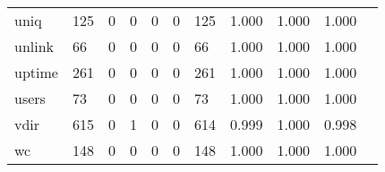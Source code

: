 \begin{longtable}{lp{1.2cm}p{1.2cm}p{1.2cm}p{1.2cm}p{1.2cm}p{1.2cm}p{1.2cm}p{1.2cm}p{1.2cm}p{1.2cm}}
uniq      &                                   125 &                                                  0 &                                                  0 &                                                  0 &                                                  0 &                                                125 &                                         1.000 &                                              1.000 &                                              1.000 \\
unlink    &                                    66 &                                                  0 &                                                  0 &                                                  0 &                                                  0 &                                                 66 &                                         1.000 &                                              1.000 &                                              1.000 \\
uptime    &                                   261 &                                                  0 &                                                  0 &                                                  0 &                                                  0 &                                                261 &                                         1.000 &                                              1.000 &                                              1.000 \\
users     &                                    73 &                                                  0 &                                                  0 &                                                  0 &                                                  0 &                                                 73 &                                         1.000 &                                              1.000 &                                              1.000 \\
vdir      &                                   615 &                                                  0 &                                                  1 &                                                  0 &                                                  0 &                                                614 &                                         0.999 &                                              1.000 &                                              0.998 \\
wc        &                                   148 &                                                  0 &                                                  0 &                                                  0 &                                                  0 &                                                148 &                                         1.000 &                                              1.000 &                                              1.000 \\

\end{longtable}
